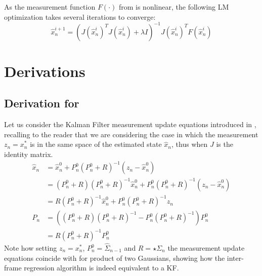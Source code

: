 \begin{DRAFT}
As the measurement function $F(\cdot)$ from  is nonlinear, the following LM optimization takes several iterations to converge:
\begin{equation}
\hat{x}_n^{i + 1} = (J(\hat{x}_n^i) ^T J(\hat{x}_n^i) + \lambda I)^{-1} J(\hat{x}_n^i)^T F(\hat{x}_n^i)
\end{equation}    
\end{DRAFT}

\section{Derivations}

\subsection{Derivation for }
\label{app:proof-kalman}
Let us consider the Kalman Filter measurement update equations introduced in , recalling to the reader that we are considering the case in which the measurement $z_n = x_n^*$ is in the same space of the estimated state $\hat{x}_n$, thus when $J$ is the identity matrix.
% 
\begin{align*}
\hat{x}_n 
&= \hat{x}_n^0 + P_n^0  (P_n^0 + R)^{-1}(z_n - \hat{x}_n^0) \\
&= (P_n^0 + R)(P_n^0 + R)^{-1}\hat{x}_n^0 + P_n^0  (P_n^0 + R)^{-1}(z_n - \hat{x}_n^0) \\
&= R(P_n^0 + R)^{-1}\hat{x}_n^0 + P_n^0  (P_n^0 + R)^{-1}z_n \\
% 
% 
P_n &= ((P_n^0 + R) (P_n^0 + R)^{-1} - P_n^0  (P_n^0 + R)^{-1}) P_n^0\\
&= R (P_n^0 + R)^{-1} P_n^0
\end{align*}
% 
Note how setting $z_n = x_n^*$, $P_n^0 = \hat{\Sigma}_{n - 1}$ and $R = \star\Sigma_{n}$ the measurement update equations coincide with  for product of two Gaussians, showing how the inter-frame regression algorithm is indeed equivalent to a KF.

